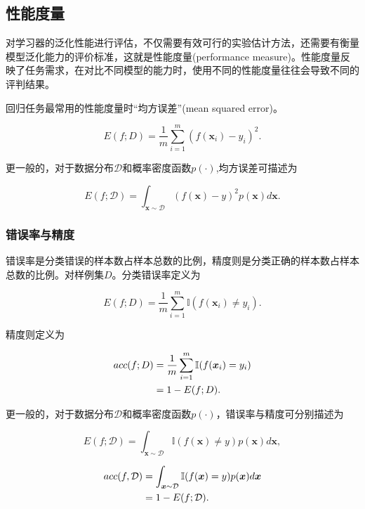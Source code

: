 \documentclass[cn,hazy,black,normal]{elegantnote}
\numberwithin{equation}{section}
\numberwithin{figure}{section}
\begin{document}
		\subsection{性能度量}
			对学习器的泛化性能进行评估，不仅需要有效可行的实验估计方法，还需要有衡量模型泛化能力的评价标准，这就是性能度量(performance measure)。性能度量反映了任务需求，在对比不同模型的能力时，使用不同的性能度量往往会导致不同的评判结果。
			
			回归任务最常用的性能度量时“均方误差”(mean squared error)。
			
			\begin{equation}
				E(f;D)=\frac{1}{m}\sum_{i = 1}^{m}(f(\boldsymbol{x}_i)-y_i)^2.
			\end{equation}
			
			更一般的，对于数据分布$\mathcal{D}$和概率密度函数$p(\cdot)$,均方误差可描述为
			
			\begin{equation}
				E(f;\mathcal{D})=\int_{\boldsymbol{x}\sim \mathcal{D}}(f(\boldsymbol{x})-y)^2p(\boldsymbol{x})d\boldsymbol{x}.
			\end{equation}
	
			\subsubsection{错误率与精度}
				错误率是分类错误的样本数占样本总数的比例，精度则是分类正确的样本数占样本总数的比例。对样例集$D$。分类错误率定义为
				
				\begin{equation}
					E(f;D)=\frac{1}{m}\sum_{i = 1}^{m}\mathbb{I}(f(\boldsymbol{x}_i)\neq y_i) .
				\end{equation}
			
				精度则定义为
				
				\begin{align}
					acc(f;D) & = \frac{1}{m}\sum_{i = 1}^{m}\mathbb{I}(f(\boldsymbol{x}_i)= y_i) \\
							 & = 1 - E(f;D)\notag .
				\end{align}
	
				更一般的，对于数据分布$\mathcal{D}$和概率密度函数$p(\cdot)$，错误率与精度可分别描述为
				
				\begin{equation}
					E(f;\mathcal{D}) = \int_{\boldsymbol{x}\sim \mathcal{D}}\mathbb{I}(f(\boldsymbol{x})\neq y)p(\boldsymbol{x})d\boldsymbol{x} ,
				\end{equation}
	
				\begin{align}
					acc(f,\mathcal{D}) & = \int_{\boldsymbol{x}\sim \mathcal{D}}\mathbb{I}(f(\boldsymbol{x})= y)p(\boldsymbol{x})d\boldsymbol{x} \\
				          	 & = 1 - E(f;\mathcal{D})\notag .
				\end{align}
			
\end{document}
